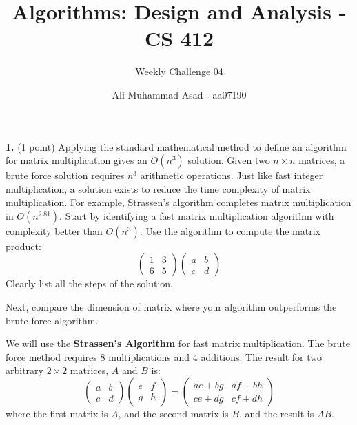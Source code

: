 \documentclass[addpoints]{exam}
\title{Algorithms: Design and Analysis - CS 412 \vspace*{-4mm}}
\author{Weekly Challenge 04}
\date{\vspace*{-4mm} Ali Muhammad Asad - aa07190}
\begin{document}
\maketitle


\begin{questions}
  \question[1]
  \textbf{1.}\; (1 point)
  Applying the standard mathematical method to define an algorithm for matrix multiplication gives an $O(n^3)$ solution. Given two $n \times n$ matrices, a brute force solution requires $n^3$ arithmetic operations. Just like fast integer multiplication, a solution exists to reduce the time complexity of matrix multiplication. For example, Strassen's algorithm completes matrix multiplication in $O(n^2.81)$. Start by identifying a fast matrix multiplication algorithm with complexity better than $O(n^3)$. Use the algorithm to compute the matrix product: \\
  \[
    \begin{pmatrix}
      1 & 3 \\
      6 & 5
    \end{pmatrix}
    \begin{pmatrix}
      a & b \\
      c & d
    \end{pmatrix}
  \]
  Clearly list all the steps of the solution.

  Next, compare the dimension of matrix where your algorithm outperforms the brute force algorithm.
  \begin{solution}
    We will use the \textbf{Strassen's Algorithm} for fast matrix multiplication. The brute force method requires 8 multiplications and 4 additions. The result for two arbitrary $ 2 \times 2 $ matrices, $A$ and $B$ is:
    $$ \begin{pmatrix}
        a & b \\ c & d
      \end{pmatrix} \begin{pmatrix}
        e & f \\ g & h
      \end{pmatrix} = \begin{pmatrix}
        ae + bg & af + bh \\ ce + dg & cf + dh
      \end{pmatrix}$$
    where the first matrix is $A$, and the second matrix is $B$, and the result is $AB$.


\end{solution}
\end{questions}
\end{document}

